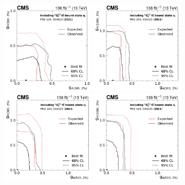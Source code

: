 \begin{figure}[!ph]
    \centering
    \includegraphics[width=0.4\textwidth]{figures/ah/contour/A_m365_w2p0__H_m500_w2p0_fc-contour.pdf}%
    \hspace*{0.05\textwidth}%
    \includegraphics[width=0.4\textwidth]{figures/ah/contour/A_m365_w2p0__H_m1000_w2p0_fc-contour.pdf} \\
    \includegraphics[width=0.4\textwidth]{figures/ah/contour/A_m500_w2p0__H_m365_w2p0_fc-contour.pdf}%
    \hspace*{0.05\textwidth}%
    \includegraphics[width=0.4\textwidth]{figures/ah/contour/A_m500_w2p0__H_m1000_w2p0_fc-contour.pdf} \\

\end{figure}
